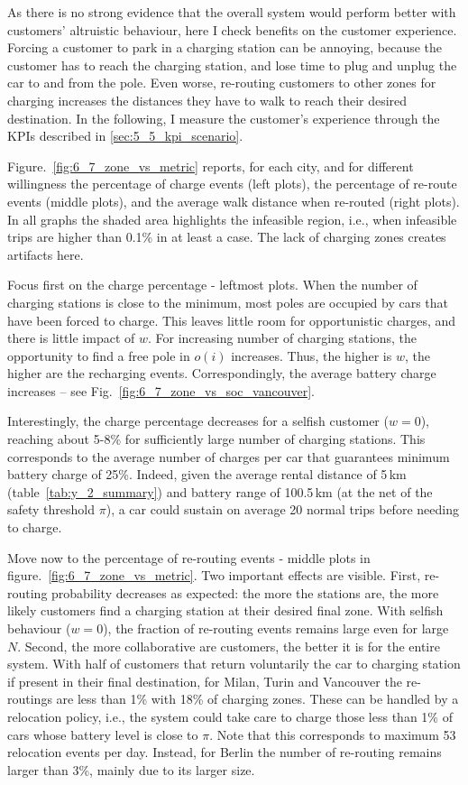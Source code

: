 As there is no strong evidence that the overall system would perform better with customers' altruistic behaviour, here I check benefits on the customer experience. Forcing a customer to park in a charging station can be annoying, because the customer has to reach the charging station, and lose time to plug and unplug the car to and from the pole. Even worse, re-routing customers to other zones for charging increases the distances they have to walk to reach their desired destination.
In the following, I measure the customer's experience through the KPIs described in \ref{sec:5_5_kpi_scenario}.

Figure.~\ref{fig:6_7_zone_vs_metric} reports, for each city, and for different willingness the percentage of charge events (left plots), the percentage of re-route events (middle plots), and the average walk distance when re-routed (right plots). In all graphs the shaded area highlights the infeasible region, i.e., when infeasible trips are higher than 0.1\% in at least a case. The lack of charging zones creates artifacts here. 

Focus first on the charge percentage - leftmost plots. When the number of charging stations is close to the minimum, most poles are occupied by cars that have been forced to charge. This leaves little room for opportunistic charges, and there is little impact of $w$. For increasing number of charging stations, the opportunity to find a free pole in $o(i)$ increases. Thus, the higher is $w$, the higher are the recharging events. Correspondingly, the average battery charge increases -- see Fig.~\ref{fig:6_7_zone_vs_soc_vancouver}.

Interestingly, the charge percentage decreases for a selfish customer ($w=0$), reaching about 5-8\% for sufficiently large number of charging stations. This corresponds to the average number of charges per car that guarantees minimum battery charge of 25\%. Indeed, given the average rental distance of 5\,km (table~\ref{tab:y_2_summary}) and battery range of 100.5\,km (at the net of the safety threshold $\pi$), a car could sustain on average 20 normal trips before needing to charge.  

Move now to the percentage of re-routing events - middle plots in figure.~\ref{fig:6_7_zone_vs_metric}. Two important effects are visible. First, re-routing probability decreases as expected: the more the stations are, the more likely customers find a charging station at their desired final zone. With selfish behaviour ($w=0$), the fraction of re-routing events remains large even for large $N$.
Second, the more collaborative are customers, the better it is for the entire system. With half of customers that return voluntarily the car to charging station if present in their final destination, for Milan, Turin and Vancouver the re-routings are less than 1\% with 18\% of charging zones. These can be handled by a relocation policy, i.e., the system could take care to charge those less than 1\% of cars whose battery level is close to $\pi$. Note that this corresponds to maximum 53 relocation events per day. Instead, for Berlin the number of re-routing remains larger than 3\%, mainly due to its larger size.



